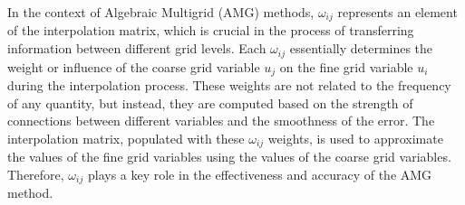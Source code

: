 \documentclass[11pt]{book}
\begin{document}
In the context of Algebraic Multigrid (AMG) methods, $\omega_{ij}$ represents an element of the interpolation matrix, which is crucial in the process of transferring information between different grid levels. Each $\omega_{ij}$ essentially determines the weight or influence of the coarse grid variable $u_j$ on the fine grid variable $u_i$ during the interpolation process. These weights are not related to the frequency of any quantity, but instead, they are computed based on the strength of connections between different variables and the smoothness of the error. The interpolation matrix, populated with these $\omega_{ij}$ weights, is used to approximate the values of the fine grid variables using the values of the coarse grid variables. Therefore, $\omega_{ij}$ plays a key role in the effectiveness and accuracy of the AMG method.
\end{document}
